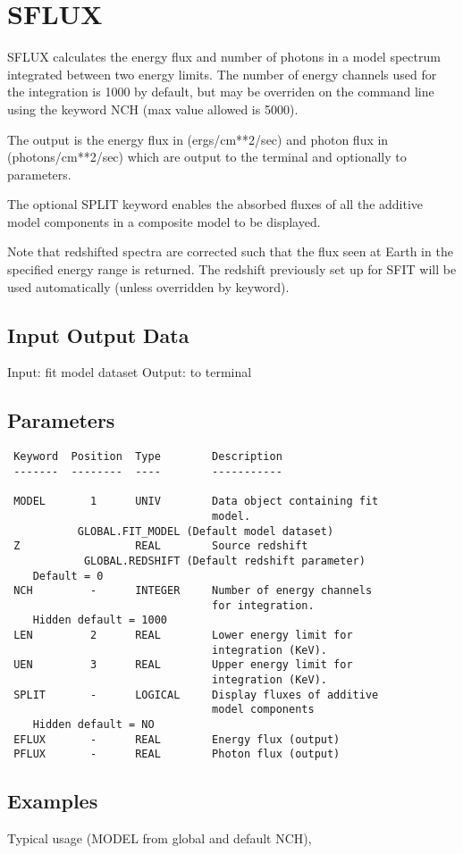 \documentclass{book}
\renewcommand{\_}{{\tt\char'137}}     %
\begin{document}
\section{SFLUX}
SFLUX calculates the energy flux and number of photons in a model
spectrum integrated between two energy limits. The number of
energy channels used for the integration is 1000 by default, but
may be overriden on the command line using the keyword NCH (max
value allowed is 5000).

The output is the energy flux in (ergs/cm**2/sec) and photon flux
in (photons/cm**2/sec)
which are output to the terminal and optionally to parameters.

The optional SPLIT keyword enables the absorbed fluxes of all the
additive model components in a composite model to be displayed.

Note that redshifted spectra are corrected such that the flux
seen at Earth in the specified energy range is returned. The
redshift previously set up for SFIT will be used automatically
(unless overridden by keyword).

\subsection{Input Output Data}
Input: fit model dataset
Output: to terminal
\subsection{Parameters}
\begin{verbatim}
 Keyword  Position  Type        Description
 -------  --------  ----        -----------

 MODEL       1      UNIV        Data object containing fit
                                model.
           GLOBAL.FIT_MODEL (Default model dataset)
 Z                  REAL        Source redshift
            GLOBAL.REDSHIFT (Default redshift parameter)
    Default = 0
 NCH         -      INTEGER     Number of energy channels
                                for integration.
    Hidden default = 1000
 LEN         2      REAL        Lower energy limit for
                                integration (KeV).
 UEN         3      REAL        Upper energy limit for
                                integration (KeV).
 SPLIT       -      LOGICAL     Display fluxes of additive
                                model components
    Hidden default = NO
 EFLUX       -      REAL        Energy flux (output)
 PFLUX       -      REAL        Photon flux (output)
\end{verbatim}\subsection{Examples}
Typical usage (MODEL from global and default NCH),
\end{document}
